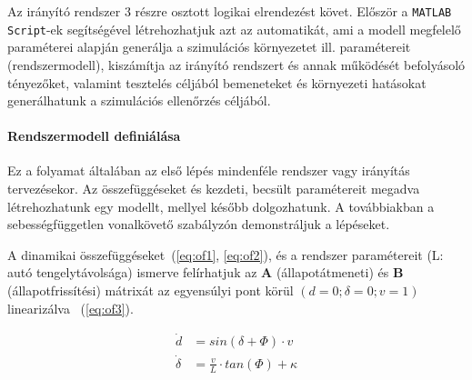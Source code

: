 Az irányító rendszer 3 részre osztott logikai elrendezést követ. Először a \verb!MATLAB Script!-ek segítségével létrehozhatjuk azt az automatikát, ami a modell megfelelő paraméterei alapján generálja a szimulációs környezetet ill. paramétereit (rendszermodell), kiszámítja az irányító rendszert és annak működését befolyásoló tényezőket, valamint tesztelés céljából bemeneteket és környezeti hatásokat generálhatunk a szimulációs ellenőrzés céljából.

\paragraph{Rendszermodell definiálása}

Ez a folyamat általában az első lépés mindenféle rendszer vagy irányítás tervezésekor. Az összefüggéseket és kezdeti, becsült paramétereit megadva létrehozhatunk egy modellt, mellyel később dolgozhatunk. A továbbiakban a sebességfüggetlen vonalkövető szabályzón demonstráljuk a lépéseket.

A dinamikai összefüggéseket~(\ref{eq:of1}, \ref{eq:of2}), és a rendszer paramétereit (L: autó tengelytávolsága) ismerve felírhatjuk az \textbf{A} (állapotátmeneti) és \textbf{B} (állapotfrissítési) mátrixát az egyensúlyi pont körül $(d = 0; \delta = 0; v = 1)$ linearizálva ~(\ref{eq:of3}).

\begin{align} 
    \dot{d} &= sin(\delta + \Phi) \cdot v  \label{eq:of1} \\ 
    \dot{\delta} &= \frac{v}{L} \cdot tan(\Phi) + \kappa \label{eq:of2}
\end{align}

